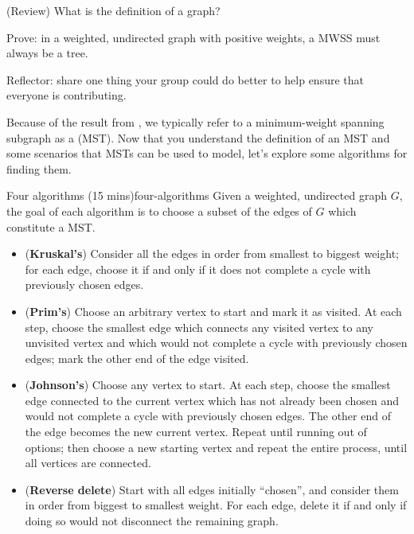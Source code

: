 \documentclass{tufte-handout}
\begin{document}
\begin{questions}
\item (Review) What is the definition of a  graph?
\item \label{q:mwss-tree} Prove: in a weighted, undirected graph with
  positive weights, a MWSS must always be a tree. 
\item Reflector: share one thing your group could do better to help
  ensure that everyone is contributing.
\end{questions}

\pause

Because of the result from , we typically refer to
a minimum-weight spanning subgraph as a 
(MST).  Now that you understand the definition of an MST and some
scenarios that MSTs can be used to model, let's explore some
algorithms for finding them.

\begin{model*}{Four algorithms (15 mins)}{four-algorithms}
  Given a weighted, undirected graph $G$, the goal of each algorithm
  is to choose a subset of the edges of $G$ which constitute a MST.
  \begin{itemize}
  \item (\textbf{Kruskal's}) Consider all the edges in order from
    smallest to biggest weight; for each edge, choose it if and only if
    it does not complete a cycle with previously chosen edges.
  \item (\textbf{Prim's}) Choose an arbitrary vertex to start and mark
    it as visited.  At each step, choose the smallest edge which
    connects any visited vertex to any unvisited vertex and which would
    not complete a cycle with previously chosen edges; mark the other
    end of the edge visited.
  \item (\textbf{Johnson's}) Choose any vertex to start.  At each
    step, choose the smallest edge connected to the current vertex which
    has not already been chosen and would not complete a cycle with
    previously chosen edges.  The other end of the edge becomes the
    new current vertex.  Repeat until running out of options; then
    choose a new starting vertex and repeat the entire process, until
    all vertices are connected.
  \item (\textbf{Reverse delete}) Start with all edges initially
    ``chosen'', and consider them in order from biggest to smallest
    weight.  For each edge, delete it if and only if doing so would
    not disconnect the remaining graph.
  \end{itemize}
\end{model*}
\end{document}
